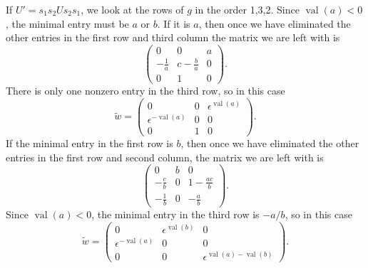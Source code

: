 \documentclass{amsart}
\theoremstyle{definition}
\def\e{\epsilon}
\def\w{\widetilde{w}}
\def\val{\mathop{\mathrm{val}}}
\begin{document}
  If $U' = s_1s_2 U s_2s_1$, we look at the rows of $g$ in the order 1,3,2.
  Since $\val(a) < 0$, the minimal entry must be $a$ or $b$.  If it is $a$,
  then once we have eliminated the other entries in the first row and third
  column the matrix we are left with is
  \begin{equation}
    \label{eq:w3-row1-a-min}
    \begin{pmatrix}
      0 & 0 & a \\ 
      -\frac{1}{a} & c - \frac{b}{a} & 0 \\
      0 & 1 & 0
    \end{pmatrix}.
  \end{equation}
  There is only one nonzero entry in the third row, so in this case 
  \begin{equation*}
    \w =  \begin{pmatrix}
      0 & 0 & \e^{\val(a)} \\ 
      \e^{-\val(a)} & 0 & 0 \\
      0 & 1 & 0 
      \end{pmatrix}.
  \end{equation*}
  If the minimal entry in the first row is $b$, then once we have eliminated
  the other entries in the first row and second column, the matrix we are left
  with is
  \begin{equation}
    \label{eq:w3-row1-b-min}
    \begin{pmatrix}
      0 & b & 0 \\ 
      -\frac{c}{b} & 0 & 1 - \frac{ac}{b} \\
      -\frac{1}{b} & 0 & -\frac{a}{b}
    \end{pmatrix}.
  \end{equation}
  Since $\val(a) < 0$, the minimal entry in the third row is $-a/b$, so in this
  case
  \begin{equation*}
    \w =  \begin{pmatrix}
      0 & \e^{\val(b)} & 0\\ 
      \e^{-\val(a)} & 0 & 0 \\
      0 & 0 & \e^{\val(a) - \val(b)}
      \end{pmatrix}.
  \end{equation*}
\end{document}
